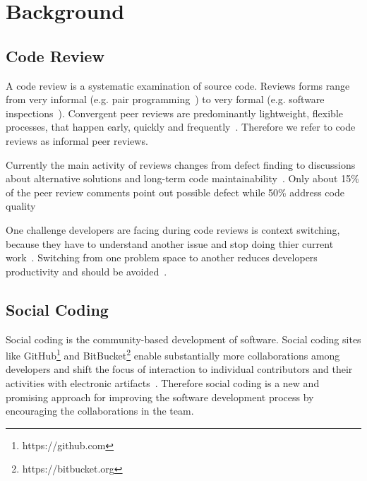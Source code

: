 \documentclass[10pt, conference]{IEEEtran}
\begin{document}
\section{Background}
\subsection{Code Review}
A code review is a systematic examination of source code. 
%
Reviews forms range from very informal (e.g. pair programming~\cite{beck2000extreme}) to very formal (e.g. software inspections~\cite{fagan2001design, ackerman1989software}). 
%
Convergent peer reviews are predominantly lightweight, flexible processes, that happen early, quickly and frequently~\cite{rigby2013PeerCodeReviews, shimagaki2016CRInSony}. 
%
Therefore we refer to code reviews as informal peer reviews. 
%
 
%
Currently the main activity of reviews changes from defect finding to discussions about alternative solutions and long-term code maintainability~\cite{rigby2013PeerCodeReviews, czerwonka2015codereviews}. 
%
Only about 15\% of the peer review comments point out possible defect while 50\% address code quality~\cite{czerwonka2015codereviews}
%

%
One challenge developers are facing during code reviews is context switching, because they have to understand another issue and stop doing thier current work~\cite{czerwonka2015codereviews, kononenko2016codereviewquality}.
%
Switching from one problem space to another reduces developers productivity and should be avoided~\cite{poppendieck2003lean}.
\subsection{Social Coding}
Social coding is the community-based development of software.
%
Social coding sites like GitHub\footnote{https://github.com} and BitBucket\footnote{https://bitbucket.org} enable substantially more collaborations among developers \cite{thung2013github} and shift the focus of interaction to individual contributors and their activities with electronic artifacts~\cite{dabbish2012social}.
%
Therefore social coding is a new and promising approach for improving the software development process by encouraging the collaborations in the team.
\end{document}
